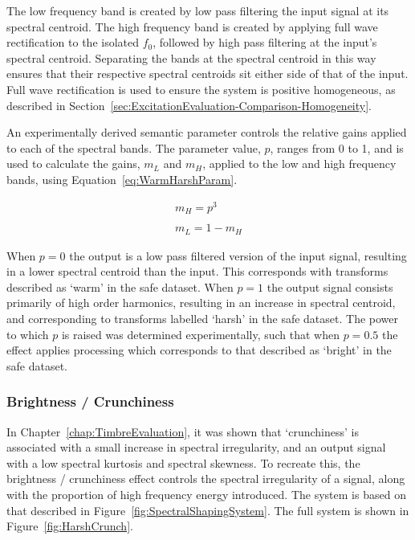 			The low frequency band is created by low pass filtering the input signal at its spectral centroid.
			The high frequency band is created by applying full wave rectification to the isolated $f_{0}$,
			followed by high pass filtering at the input's spectral centroid.  Separating the bands at the
			spectral centroid in this way ensures that their respective spectral centroids sit either side of
			that of the input. Full wave rectification is used to ensure the system is positive homogeneous, as
			described in Section~\ref{sec:ExcitationEvaluation-Comparison-Homogeneity}.

			An experimentally derived semantic parameter controls the relative gains applied to each of the
			spectral bands. The parameter value, $p$, ranges from 0 to 1, and is used to calculate the gains,
			$m_{L}$ and $m_{H}$, applied to the low and high frequency bands, using
			Equation~\ref{eq:WarmHarshParam}.

			\begin{gather}
				m_{H} = p^{3} \nonumber \\
				\nonumber \\
				m_{L} = 1 - m_{H}
				\label{eq:WarmHarshParam}
			\end{gather}

			When $p = 0$  the output is a low pass filtered version of the input signal, resulting in a lower
			spectral centroid than the input. This corresponds with transforms described as `warm' in the
			\acrshort{safe} dataset. When $p = 1$ the output signal consists primarily of high order harmonics,
			resulting in an increase in spectral centroid, and corresponding to transforms labelled `harsh' in
			the \acrshort{safe} dataset.  The power to which $p$ is raised was determined experimentally, such
			that when $p = 0.5$ the effect applies processing which corresponds to that described as `bright'
			in the \acrshort{safe} dataset. 

		\subsubsection*{Brightness / Crunchiness}
			In Chapter~\ref{chap:TimbreEvaluation}, it was shown that `crunchiness' is associated with a small
			increase in spectral irregularity, and an output signal with a low spectral kurtosis and spectral
			skewness. To recreate this, the brightness / crunchiness effect controls the spectral irregularity
			of a signal, along with the proportion of high frequency energy introduced. The system is based on
			that described in Figure~\ref{fig:SpectralShapingSystem}. The full system is shown in
			Figure~\ref{fig:HarshCrunch}.

